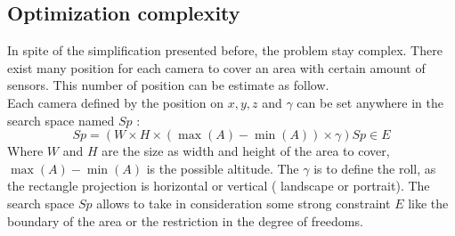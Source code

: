 %    


 
 \subsection{Optimization complexity} \label{sec:OptimizationComplexity}
 
In spite of the simplification presented before, the problem stay complex. There exist many position for each camera to cover an area with certain amount of sensors. This number of position can be estimate as follow.\\   
Each camera defined by the position on $x, y, z $ and $ \gamma$ can be set anywhere in the search space  named $Sp$ : 
\begin{equation}\label{eq:SearchSpace}
 Sp=(W\times H \times ( \max(A)-\min(A)) \times \gamma )  Sp \in E 
\end{equation}
Where $W$ and $H$ are the size as width and height of the area to cover, $\max(A)-\min(A)$  is the possible altitude. The $\gamma$ is to define the roll, as the rectangle projection is horizontal or vertical ( landscape or portrait). The search space $Sp$ allows to take in consideration some strong constraint $E$ like the boundary of the area or the restriction in the degree of freedoms.

